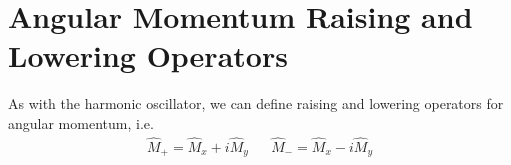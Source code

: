 %
%
%
%

\section*{Angular Momentum Raising and Lowering Operators}

	As with the harmonic oscillator, we can define raising and lowering operators for angular momentum, i.e.
	\begin{align*}
		\hat M_+ = \hat M_x + i\hat M_y & & \hat M_- = \hat M_x - i\hat M_y
	\end{align*}
	

